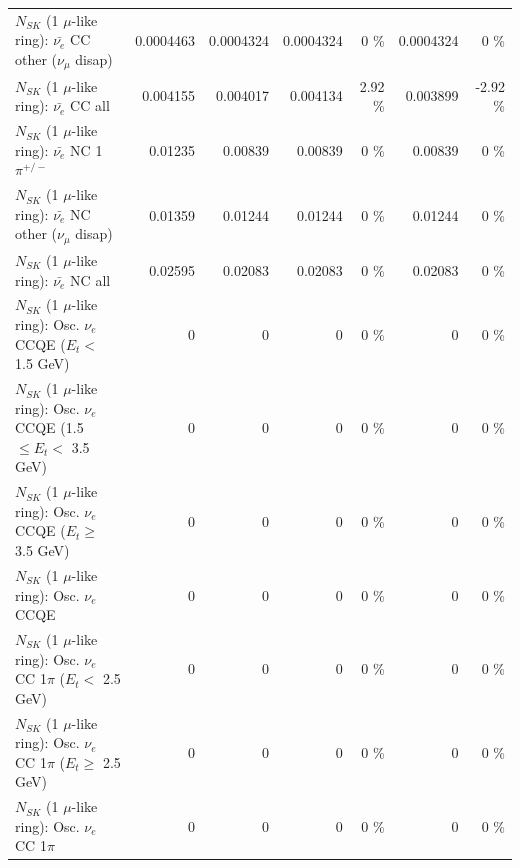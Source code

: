 \begin{table}
\begin{tabular}{| l | r | r | r  r | r  r |}
          $N_{SK}$ (1 $\mu$-like ring): $\bar{\nu_e}$ CC other ($\nu_\mu$ disap) &       0.0004463 &       0.0004324 &       0.0004324 &        0 \%  &       0.0004324 &        0 \%  \\ 
                            $N_{SK}$ (1 $\mu$-like ring): $\bar{\nu_{e}}$ CC all &        0.004155 &        0.004017 &        0.004134 &     2.92 \%  &        0.003899 &    -2.92 \%  \\ 
\hline
                     $N_{SK}$ (1 $\mu$-like ring): $\bar{\nu_e}$ NC 1$\pi^{+/-}$ &         0.01235 &         0.00839 &         0.00839 &        0 \%  &         0.00839 &        0 \%  \\ 
          $N_{SK}$ (1 $\mu$-like ring): $\bar{\nu_e}$ NC other ($\nu_\mu$ disap) &         0.01359 &         0.01244 &         0.01244 &        0 \%  &         0.01244 &        0 \%  \\ 
                            $N_{SK}$ (1 $\mu$-like ring): $\bar{\nu_{e}}$ NC all &         0.02595 &         0.02083 &         0.02083 &        0 \%  &         0.02083 &        0 \%  \\ 
\hline
\hline
\hline
             $N_{SK}$ (1 $\mu$-like ring): Osc. $\nu_e$ CCQE ($E_{t} <$ 1.5 GeV) &               0 &               0 &               0 &        0 \%  &               0 &        0 \%  \\ 
    $N_{SK}$ (1 $\mu$-like ring): Osc. $\nu_e$ CCQE (1.5 $\leq E_{t} <$ 3.5 GeV) &               0 &               0 &               0 &        0 \%  &               0 &        0 \%  \\ 
          $N_{SK}$ (1 $\mu$-like ring): Osc. $\nu_e$ CCQE ($E_{t} \geq$ 3.5 GeV) &               0 &               0 &               0 &        0 \%  &               0 &        0 \%  \\ 
\hline
                                 $N_{SK}$ (1 $\mu$-like ring): Osc. $\nu_e$ CCQE &               0 &               0 &               0 &        0 \%  &               0 &        0 \%  \\ 
\hline
        $N_{SK}$ (1 $\mu$-like ring): Osc. $\nu_e$ CC 1$\pi$ ($E_{t} <$ 2.5 GeV) &               0 &               0 &               0 &        0 \%  &               0 &        0 \%  \\ 
     $N_{SK}$ (1 $\mu$-like ring): Osc. $\nu_e$ CC 1$\pi$ ($E_{t} \geq$ 2.5 GeV) &               0 &               0 &               0 &        0 \%  &               0 &        0 \%  \\ 
\hline
                            $N_{SK}$ (1 $\mu$-like ring): Osc. $\nu_e$ CC 1$\pi$ &               0 &               0 &               0 &        0 \%  &               0 &        0 \%  \\ 

\end{tabular}
\end{table}
